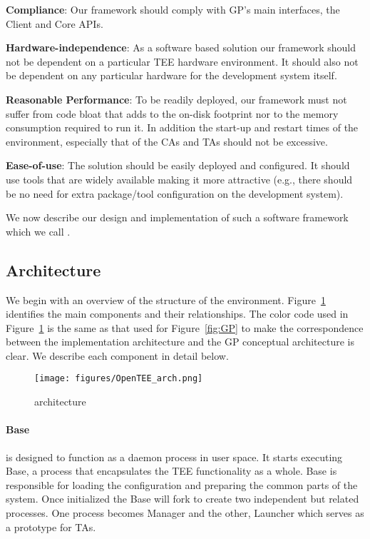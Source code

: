 \documentclass[10pt,conference,letterpaper]{IEEEtran}
\newcommand{\opentee}{\protect{TEE-Vi}\xspace}
\newcommand{\opentee}{\protect{Open-TEE}\xspace}
\begin{document}
\noindent\textbf{Compliance}: Our framework should comply with GP's main interfaces, the Client and Core APIs.

\noindent\textbf{Hardware-independence}: As a software based solution our framework should not be dependent on a particular TEE hardware environment. It should also not be dependent on any particular hardware for the development system itself.



\noindent\textbf{Reasonable Performance}: To be readily deployed, our framework must not suffer from code bloat that adds to the on-disk footprint nor to the memory consumption required to run it.  In addition the start-up and restart times of the environment, especially that of the CAs and TAs should not be excessive.  


\noindent\textbf{Ease-of-use}: The solution should be easily deployed and configured. It should use tools that are widely available making it more attractive (e.g., there should be no need for extra package/tool configuration on the development system).

We now describe our design and implementation of such a software framework which we call \opentee.

\subsection{Architecture}
\label{subsec:arhictectire}
We begin with an overview of the structure of the \opentee environment. Figure~\ref{fig:opentee} identifies the main components and their relationships. The color code used in Figure~\ref{fig:opentee} is the same as that used for Figure~\ref{fig:GP} to make the correspondence between the \opentee implementation architecture and the GP conceptual architecture is clear. We describe each component in detail below.


\begin{figure}[h]
\centering
\texttt{[image: figures/OpenTEE\_arch.png]}
\caption{\opentee architecture}
\label{fig:opentee}
\end{figure}

\paragraph{Base}
\opentee is designed to function as a daemon process in user space. It starts executing Base, a process that encapsulates the TEE functionality as a whole.  Base is responsible for loading the configuration and preparing the common parts of the system.  Once initialized the Base will fork to create two independent but related processes. One process becomes Manager and the other, Launcher which serves as a prototype for TAs. 
\end{document}
